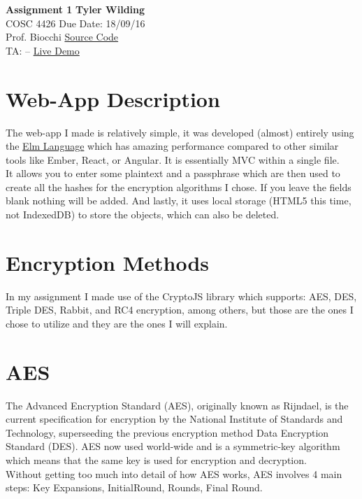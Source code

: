 \documentclass[a4paper, 11pt]{article}
\begin{document}
\noindent
\large\textbf{Assignment 1} \hfill \textbf{Tyler Wilding} \\
\normalsize COSC 4426 \hfill Due Date: 18/09/16 \\
Prof. Biocchi \hfill \href{https://github.com/xTVaser/Schoolwork-Fall-2016/tree/master/Internet%20Security/encryption-webapp}{Source Code} \\
TA: -- \hfill \href{http://notturing.ddns.net/tyler/IS_ASS1/index.html}{Live Demo}

\section*{Web-App Description}
The web-app I made is relatively simple, it was developed (almost) entirely using the \href{http://elm-lang.org/}{Elm Language} which has amazing performance compared to other similar tools like Ember, React, or Angular.  It is essentially MVC within a single file.\\

It allows you to enter some plaintext and a passphrase which are then used to create all the hashes for the encryption algorithms I chose.  If you leave the fields blank nothing will be added.  And lastly, it uses local storage (HTML5 this time, not IndexedDB) to store the objects, which can also be deleted.

\section*{Encryption Methods}

In my assignment I made use of the CryptoJS library which supports: AES, DES, Triple DES, Rabbit, and RC4 encryption, among others, but those are the ones I chose to utilize and they are the ones I will explain. 

\section*{AES}
The Advanced Encryption Standard (AES), originally known as Rijndael, is the current specification for encryption by the National Institute of Standards and Technology, superseeding the previous encryption method Data Encryption Standard (DES).  AES now used world-wide and is a symmetric-key algorithm which means that the same key is used for encryption and decryption. \\

Without getting too much into detail of how AES works, AES involves 4 main steps: Key Expansions, InitialRound, Rounds, Final Round.
\end{document}
